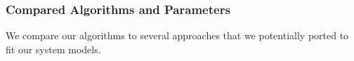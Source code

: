 \subsubsection{Compared Algorithms and Parameters}
\label{section:centrality:compared-algorithms}

We compare our algorithms to several approaches that we potentially ported to fit our system models.




\newcommand{\myParagraph}[1]{\textit{#1: }}

